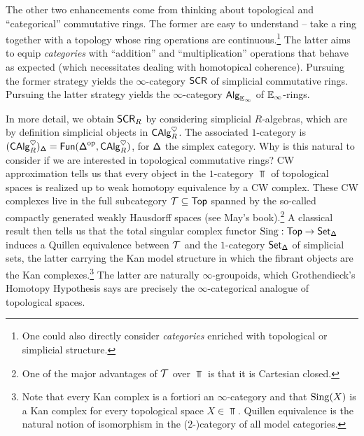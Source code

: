 \documentclass[11pt]{article}
\begin{document}
The other two enhancements come from thinking about topological and ``categorical'' commutative rings. The former are easy to understand -- take a ring together with a topology whose ring operations are continuous.\footnote{One could also directly consider \emph{categories} enriched with topological or simplicial structure.} The latter aims to equip \emph{categories} with ``addition'' and ``multiplication'' operations that behave as expected (which necessitates dealing with homotopical coherence). Pursuing the former strategy yields the $\infty$-category $\operatorname{\mathsf{SCR}}$ of simplicial commutative rings. Pursuing the latter strategy yields the $\infty$-category $\operatorname{\mathsf{Alg}}_{\mathbb{E}_{\infty}}$ of $\mathbb{E}_{\infty}$-rings.

In more detail, we obtain $\operatorname{\mathsf{SCR}}_R$ by considering simplicial $R$-algebras, which are by definition simplicial objects in $\operatorname{\mathsf{CAlg}}_R^{\heartsuit}$. The associated $1$-category is $(\operatorname{\mathsf{CAlg}}_R^{\heartsuit})_{\operatorname{\mathbf{\mathsf{\Delta}}}}=\operatorname{\mathsf{Fun}}(\operatorname{\mathbf{\mathsf{\Delta}}}^{\operatorname{op}},\operatorname{\mathsf{CAlg}}_R^{\heartsuit})$, for $\operatorname{\mathbf{\mathsf{\Delta}}}$ the simplex category. Why is this natural to consider if we are interested in topological commutative rings? CW approximation tells us that every object in the $1$-category $\Top$ of topological spaces is realized up to weak homotopy equivalence by a CW complex. These CW complexes live in the full subcategory $\mathcal{T}\subseteq\operatorname{\mathsf{Top}}$ spanned by the so-called compactly generated weakly Hausdorff spaces (see May's book).\footnote{One of the major advantages of $\mathcal{T}$ over $\Top$ is that it is Cartesian closed.} A classical result then tells us that the total singular complex functor $\operatorname{Sing}: \operatorname{\mathsf{Top}}\to\operatorname{\mathsf{Set}}_{\operatorname{\mathbf{\mathsf{\Delta}}}}$ induces a Quillen equivalence between $\mathcal{T}$ and the $1$-category $\operatorname{\mathsf{Set}}_{\operatorname{\mathbf{\mathsf{\Delta}}}}$ of simplicial sets, the latter carrying the Kan model structure in which the fibrant objects are the Kan complexes.\footnote{Note that every Kan complex is a fortiori an $\infty$-category and that $\operatorname{Sing}(X)$ is a Kan complex for every topological space $X\in\Top$. Quillen equivalence is the natural notion of isomorphism in the ($2$-)category of all model categories.} The latter are naturally $\infty$-groupoids, which Grothendieck's Homotopy Hypothesis says are precisely the $\infty$-categorical analogue of topological spaces.
\end{document}
